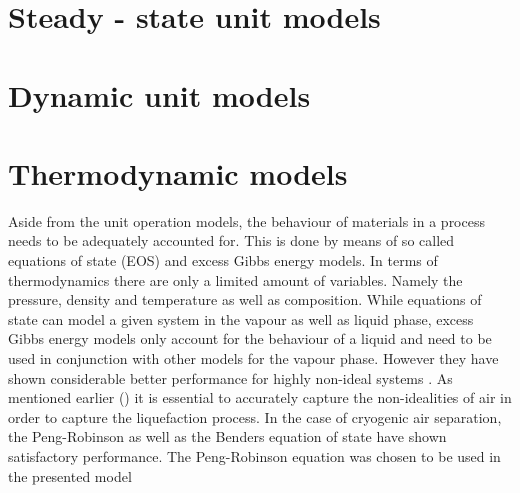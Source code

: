     \section{Steady - state unit models}
    \label{sec:mathpro:steady}
        

    \section{Dynamic unit models}
    \label{sec:mathpro:dynamic}
        

%        

    \section{Thermodynamic models}
        \label{sec:mathpro:thermo}

        Aside from the unit operation models, the behaviour of materials in a process needs to be adequately
        accounted for. This is done by means of so called equations of state (EOS) and excess Gibbs energy
        models. In terms of thermodynamics there are only a limited amount of variables. Namely the pressure,
        density and temperature as well as composition. While equations of state can model a given system in
        the vapour as well as liquid phase, excess Gibbs energy models only account for the behaviour of a liquid
        and need to be used in conjunction with other models for the vapour phase. However they have shown
        considerable better performance for highly non-ideal systems \cite{AndreasPfennig.2003}. As mentioned
        earlier () it is essential to accurately capture the non-idealities of air
        in order to capture the liquefaction process. In the case of cryogenic air separation, the Peng-Robinson
        as well as the Benders equation of state have shown satisfactory performance. The Peng-Robinson equation
        was chosen to be used in the presented model

